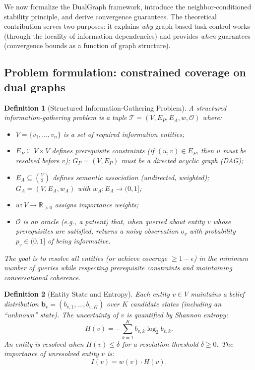 \documentclass[11pt,a4paper]{article}
\newtheorem{definition}{Definition}
\begin{document}
We now formalize the DualGraph framework, introduce the neighbor-conditioned
stability principle, and derive convergence guarantees. The theoretical
contribution serves two purposes: it explains \emph{why} graph-based task
control works (through the locality of information dependencies) and provides
\emph{when} guarantees (convergence bounds as a function of graph structure).

\subsection{Problem formulation: constrained coverage on dual graphs}
\label{sec:theory_formulation}

\begin{definition}[Structured Information-Gathering Problem]
\label{def:sig}
A \emph{structured information-gathering problem} is a tuple
$\mathcal{T} = (V, E_P, E_A, w, \mathcal{O})$ where:
\begin{itemize}[noitemsep]
  \item $V = \{v_1, \ldots, v_n\}$ is a set of required information entities;
  \item $E_P \subseteq V \times V$ defines prerequisite constraints
        (if $(u, v) \in E_P$, then $u$ must be resolved before $v$);
        $G_P = (V, E_P)$ must be a directed acyclic graph (DAG);
  \item $E_A \subseteq \binom{V}{2}$ defines semantic association
        (undirected, weighted); $G_A = (V, E_A, w_A)$ with
        $w_A: E_A \to (0, 1]$;
  \item $w: V \to \mathbb{R}_{>0}$ assigns importance weights;
  \item $\mathcal{O}$ is an oracle (e.g., a patient) that, when queried about
        entity $v$ whose prerequisites are satisfied, returns a noisy
        observation $o_v$ with probability $p_v \in (0, 1]$ of being
        informative.
\end{itemize}
The goal is to resolve all entities (or achieve coverage $\geq 1 - \epsilon$)
in the minimum number of queries while respecting prerequisite constraints and
maintaining conversational coherence.
\end{definition}

\begin{definition}[Entity State and Entropy]
\label{def:entropy}
Each entity $v \in V$ maintains a belief distribution $\mathbf{b}_v =
(b_{v,1}, \ldots, b_{v,K})$ over $K$ candidate states (including an
``unknown'' state). The uncertainty of $v$ is quantified by Shannon entropy:
\[
  H(v) = -\sum_{k=1}^{K} b_{v,k} \log_2 b_{v,k}.
\]
An entity is \emph{resolved} when $H(v) \leq \delta$ for a resolution
threshold $\delta \geq 0$. The \emph{importance} of unresolved entity $v$ is:
\[
  I(v) = w(v) \cdot H(v).
\]
\end{definition}
\end{document}
